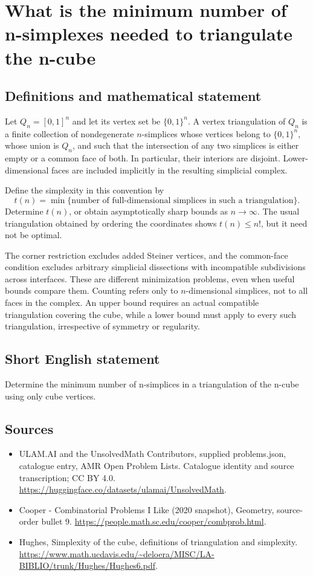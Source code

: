 \documentclass[11pt,a4paper]{article}
\begin{document}
\section*{What is the minimum number of n-simplexes needed to triangulate the n-cube}\label{statement}

\subsection{Definitions and mathematical statement}
Let $Q_n=[0,1]^n$ and let its vertex set be $\{0,1\}^n$.
A vertex triangulation of $Q_n$ is a finite collection of
nondegenerate $n$-simplices whose vertices belong to $\{0,1\}^n$,
whose union is $Q_n$, and such that the intersection of any two
simplices is either empty or a common face of both. In particular,
their interiors are disjoint. Lower-dimensional faces are included
implicitly in the resulting simplicial complex.

Define the simplexity in this convention by
\[
 t(n)=\min\{\text{number of full-dimensional simplices in such a
 triangulation}\}.
\]
Determine $t(n)$, or obtain asymptotically sharp bounds as
$n\to\infty$. The usual triangulation obtained by ordering the
coordinates shows $t(n)\le n!$, but it need not be optimal.

The corner restriction excludes added Steiner vertices, and the
common-face condition excludes arbitrary simplicial dissections
with incompatible subdivisions across interfaces. These are
different minimization problems, even when useful bounds compare
them. Counting refers only to $n$-dimensional simplices, not to all
faces in the complex. An upper bound requires an actual compatible
triangulation covering the cube, while a lower bound must apply to
every such triangulation, irrespective of symmetry or regularity.
\subsection{Short English statement}
Determine the minimum number of n-simplices in a triangulation of the n-cube using only cube vertices.
\subsection{Sources}
\begin{itemize}
\item[S1] ULAM.AI and the UnsolvedMath Contributors, supplied problems.json, catalogue entry, AMR Open Problem Lists. Catalogue identity and source transcription; CC BY 4.0.
\url{https://huggingface.co/datasets/ulamai/UnsolvedMath}.
\item[S2] Cooper - Combinatorial Problems I Like (2020 snapshot), Geometry, source-order bullet 9. 
\url{https://people.math.sc.edu/cooper/combprob.html}.
\item[S3] Hughes, Simplexity of the cube, definitions of triangulation and simplexity.
\url{https://www.math.ucdavis.edu/~deloera/MISC/LA-BIBLIO/trunk/Hughes/Hughes6.pdf}.
\end{itemize}
\end{document}
